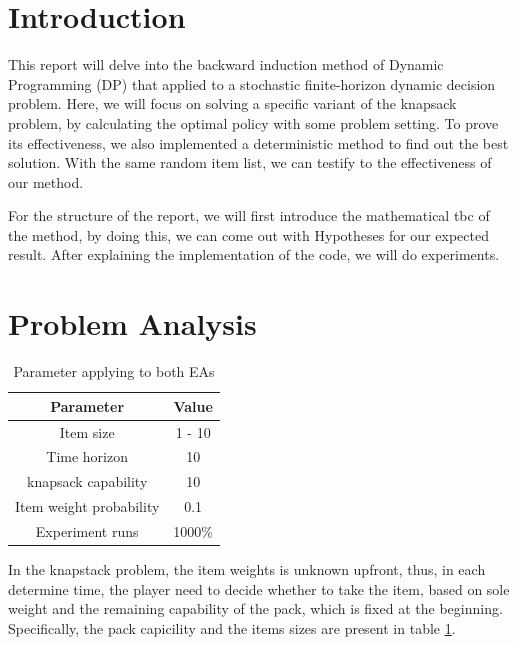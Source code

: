 
\section{Introduction}

This report will delve into the backward induction method of Dynamic Programming (DP) that applied to a stochastic finite-horizon dynamic decision problem. Here, we will focus on solving a specific variant of the knapsack problem, by calculating the optimal policy with some problem setting. To prove its effectiveness, we also implemented a deterministic method to find out the best solution. With the same random item list, we can testify to the effectiveness of our method. 

For the structure of the report, we will first introduce the mathematical {tbc} of the method, by doing this, we can come out with Hypotheses for our expected result. After explaining the implementation of the code, we will do experiments.
\section{Problem Analysis}
\begin{table}
    \centering
    \caption{Parameter applying to both EAs}
    \label{tab:my_label}
    \begin{tabular}{@{}cc@{}}
     \hline %
        Parameter & Value \\ \hline
        Item size & 1 - 10 \\
        Time horizon & 10 \\
        knapsack capability & 10 \\
        Item weight probability & 0.1 \\
        Experiment runs & 1000\% \\\hline
    \end{tabular}
\end{table}

In the knapstack problem, the item weights is unknown upfront, thus, in each determine time, the player need to decide whether to take the item, based on sole weight and the remaining capability of the pack, which is fixed at the beginning. 
Specifically, the pack capicility and the items sizes are present in table \ref{tab:my_label}.

